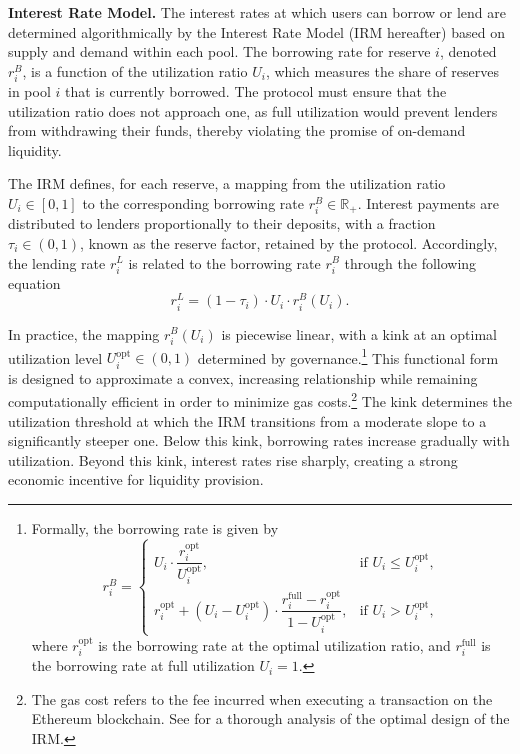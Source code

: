 \documentclass[a4paper,UKenglish,cleveref, autoref, thm-restate]{informs3}
\begin{document}
\textbf{Interest Rate Model.} The interest rates at which users can borrow or lend are determined algorithmically by the Interest Rate Model (IRM hereafter) based on supply and demand within each pool. The borrowing rate for reserve \(i\), denoted \(r^B_i\), is a function of the utilization ratio \(U_i\), which measures the share of reserves in pool \(i\) that is currently borrowed. 
The protocol must ensure that the utilization ratio does not approach one, as full utilization would prevent lenders from withdrawing their funds, thereby violating the promise of on-demand liquidity.

The IRM defines, for each reserve, a mapping from the utilization ratio \(U_{i} \in [0,1]\) to the corresponding borrowing rate \(r^B_{i} \in \mathbb{R}_+\). Interest payments are distributed to lenders proportionally to their deposits, with a fraction \(\tau_{i} \in (0,1)\), known as the reserve factor, retained by the protocol. Accordingly, the lending rate \(r^L_{i}\) is related to the borrowing rate $r^B_{i}$ through the following equation
\begin{equation*}
    r^L_{i} = (1 - \tau_{i})\cdot U_{i} \cdot r^B_{i}(U_{i}).
\end{equation*}

In practice, the mapping $r^B_{i}(U_{i})$ is piecewise linear, with a kink at an optimal utilization level $U^{\text{opt}}_{i} \in (0,1)$ determined by governance.\footnote{Formally, the borrowing rate is given by 
\begin{equation*}
    r_{i}^{B} = \begin{cases} U_{i} \cdot \dfrac{r^{\text{opt}}_{i}}{U^{\text{opt}}_{i}}, & \text{if } U_{i} \leq U^{\text{opt}}_{i}, \\[10pt] r^{\text{opt}}_{i} + \left(U_{i} - U^{\text{opt}}_{i}\right) \cdot \dfrac{r^{\text{full}}_{i} - r^{\text{opt}}_{i}}{1 - U^{\text{opt}}_{i}}, & \text{if } U_{i} > U^{\text{opt}}_{i}, \end{cases}
\end{equation*}
where $r^{\text{opt}}_{i}$ is the borrowing rate at the optimal utilization ratio, and $r^{\text{full}}_{i}$ is the borrowing rate at full
utilization $U_{i}=1$.} This functional form is designed to approximate a convex, increasing relationship while remaining computationally efficient in order to minimize gas costs.\footnote{The gas cost refers to the fee incurred when executing a transaction on the Ethereum blockchain. See \cite{Bertucci2026} for a thorough analysis of the optimal design of the IRM.} The kink determines the utilization threshold at which the IRM transitions from a moderate slope to a significantly steeper one. Below this kink, borrowing rates increase gradually with utilization. Beyond this kink, interest rates rise sharply, creating a strong economic incentive for liquidity provision.
\end{document}
